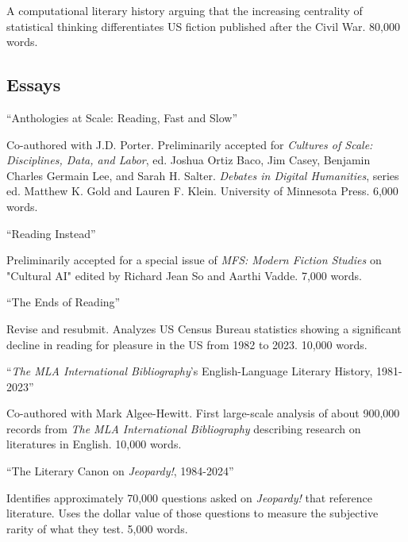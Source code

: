\documentclass[12pt,letterpaper]{report}
\begin{document}
\tabto{2em} A computational literary history arguing that the increasing centrality of statistical thinking differentiates US fiction published after the Civil War. 80,000 words.

\subsection*{Essays}

\enquote{Anthologies at Scale: Reading, Fast and Slow}

\smallskip

\tabto{2em} Co-authored with J.D. Porter. Preliminarily accepted for \textit{Cultures of Scale: Disciplines, Data, and Labor}, ed. Joshua Ortiz Baco, Jim Casey, Benjamin Charles Germain Lee, and Sarah H. Salter. \textit{Debates in Digital Humanities}, series ed. Matthew K. Gold and Lauren F. Klein. University of Minnesota Press. 6,000 words.

\bigskip

\enquote{Reading Instead}

\smallskip

\tabto{2em} Preliminarily accepted for a special issue of \textit{MFS: Modern Fiction Studies} on "Cultural AI" edited by Richard Jean So and Aarthi Vadde. 7,000 words.

\bigskip

\enquote{The Ends of Reading}

\smallskip

\tabto{2em} Revise and resubmit. Analyzes US Census Bureau statistics showing a significant decline in reading for pleasure in the US from 1982 to 2023. 10,000 words.

\bigskip

\enquote{\emph{The MLA International Bibliography}'s English-Language Literary History, 1981-2023}

\smallskip

\tabto{2em} Co-authored with Mark Algee-Hewitt. First large-scale analysis of about 900,000 records from \textit{The MLA International Bibliography} describing research on literatures in English. 10,000 words.

\bigskip

\enquote{The Literary Canon on \emph{Jeopardy!}, 1984-2024}

\smallskip

\tabto{2em} Identifies approximately 70,000 questions asked on \emph{Jeopardy!} that reference literature. Uses the dollar value of those questions to measure the subjective rarity of what they test. 5,000 words.
\end{document}
